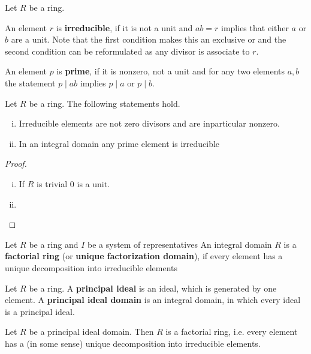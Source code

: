	\begin{definition}
		Let $R$ be a ring. 

		An element $r$ is \textbf{irreducible}, if it is not a unit and $ab = r$ implies that either $a$ or $b$ are a unit. Note that the first condition makes this an exclusive or and the second condition can be reformulated as any divisor is associate to $r$.

		An element $p$ is \textbf{prime}, if it is nonzero, not a unit and for any two elements $a,b$ the statement $p \mid ab$ implies $p \mid a$ or $p \mid b$.
	\end{definition}

	\begin{lemma}
		Let $R$ be a ring. The following statements hold.
		\begin{enumerate}[(i)]
			\item{
				Irreducible elements are not zero divisors and are inparticular nonzero.
			}
			\item{
				In an integral domain any prime element is irreducible
			}
		\end{enumerate}
	\end{lemma}
	\begin{proof}
		\begin{enumerate}[(i)]
			\item{
				If $R$ is trivial $0$ is a unit.
			}
			\item{

			}
		\end{enumerate}
	\end{proof}

	\begin{definition}
		Let $R$ be a ring and $I$ be a system of representatives
		An integral domain $R$ is a \textbf{factorial ring} (or \textbf{unique factorization domain}), if every element has a unique decomposition into irreducible elements
	\end{definition}

	\begin{definition}
		Let $R$ be a ring. A \textbf{principal ideal} is an ideal, which is generated by one element. A \textbf{principal ideal domain} is an integral domain, in which every ideal is a principal ideal.
	\end{definition}

	\begin{theorem}
		Let $R$ be a principal ideal domain. Then $R$ is a factorial ring, i.e. every element has a (in some sense) unique decomposition into irreducible elements.
	\end{theorem}

